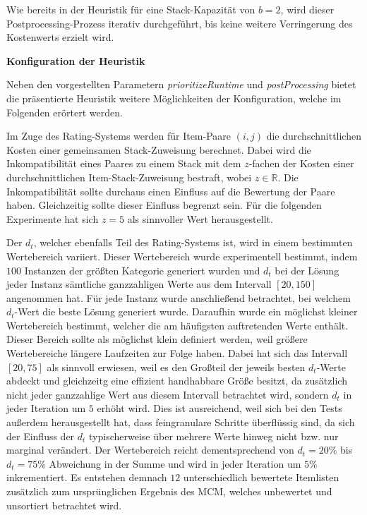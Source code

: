 Wie bereits in der Heuristik für eine Stack-Kapazität von $b = 2$, wird dieser Postprocessing-Prozess
iterativ durchgeführt, bis keine weitere Verringerung des Kostenwerts erzielt wird.

\textbf{Konfiguration der Heuristik}

Neben den vorgestellten Parametern \textit{prioritizeRuntime} und \textit{postProcessing} bietet
die präsentierte Heuristik weitere Möglichkeiten der Konfiguration, welche im Folgenden erörtert werden.

Im Zuge des Rating-Systems werden für Item-Paare $(i, j)$ die durchschnittlichen Kosten einer gemeinsamen
Stack-Zuweisung berechnet. Dabei wird die Inkompatibilität eines Paares zu einem Stack mit dem $z$-fachen
der Kosten einer durchschnittlichen Item-Stack-Zuweisung bestraft, wobei $z \in \mathbb{R}$.
Die Inkompatibilität sollte durchaus einen Einfluss auf die Bewertung der Paare haben.
Gleichzeitig sollte dieser Einfluss begrenzt sein. Für die folgenden Experimente hat sich $z = 5$ als sinnvoller Wert herausgestellt.

Der  $d_t$, welcher ebenfalls Teil des Rating-Systems ist, wird in einem bestimmten
Wertebereich variiert. Dieser Wertebereich wurde experimentell bestimmt, indem $100$ Instanzen der größten Kategorie generiert
wurden und $d_t$ bei der Lösung jeder Instanz sämtliche ganzzahligen Werte aus dem Intervall $[20, 150]$ angenommen hat.
Für jede Instanz wurde anschließend betrachtet, bei welchem $d_t$-Wert die beste Lösung generiert wurde.
Daraufhin wurde ein möglichst kleiner Wertebereich bestimmt, welcher die am häufigsten auftretenden Werte enthält.
Dieser Bereich sollte als möglichst klein definiert werden, weil größere Wertebereiche längere Laufzeiten zur Folge haben.
Dabei hat sich das Intervall $[20, 75]$ als sinnvoll erwiesen, weil es den Großteil der jeweils besten $d_t$-Werte
abdeckt und gleichzeitg eine effizient handhabbare Größe besitzt, da zusätzlich nicht jeder ganzzahlige Wert aus diesem Intervall betrachtet wird, sondern $d_t$ in jeder Iteration um $5$ erhöht wird. Dies ist ausreichend, weil sich bei den Tests außerdem herausgestellt hat, dass feingranulare Schritte überflüssig sind, da sich der Einfluss der $d_t$ typischerweise über mehrere Werte hinweg nicht bzw. nur marginal verändert. Der Wertebereich reicht dementsprechend von
$d_t = 20 \%$ bis $d_t = 75 \%$ Abweichung in der Summe und wird in jeder Iteration um $5 \%$ inkrementiert.
Es entstehen demnach $12$ unterschiedlich bewertete Itemlisten zusätzlich zum ursprünglichen Ergebnis des \textsc{MCM},
welches unbewertet und unsortiert betrachtet wird.

